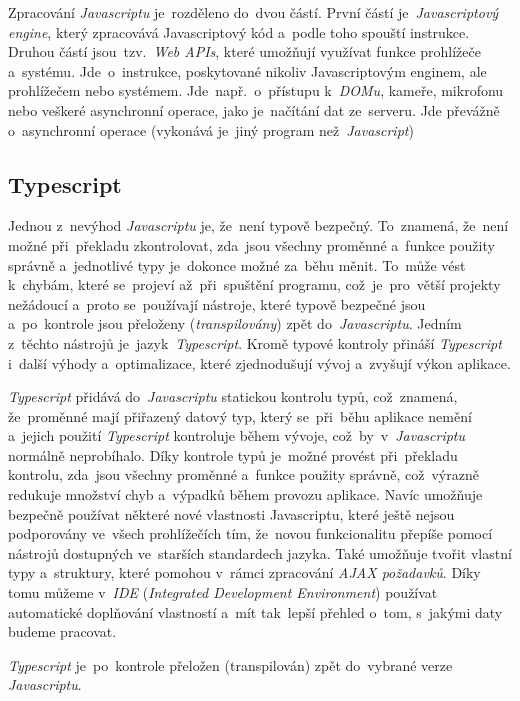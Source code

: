 \documentclass[10pt,a4paper]{article}
\begin{document}
            Zpracování \emph{Javascriptu} je~rozděleno do~dvou částí. První částí je~\emph{Javascriptový engine}, který zpracovává Javascriptový kód a~podle toho spouští instrukce. Druhou částí jsou~tzv.~\emph{Web APIs}, které umožňují využívat funkce prohlížeče a~systému. Jde~o~instrukce, poskytované nikoliv Javascriptovým enginem, ale prohlížečem nebo systémem. Jde~např.~o~přístupu k~\emph{DOMu}, kameře, mikrofonu nebo veškeré asynchronní operace, jako je~načítání dat ze~serveru. Jde převážně o~asynchronní operace (vykonává je~jiný program než~\emph{Javascript}) \cite{kantor_javascript}

        \subsection{Typescript}
            Jednou z~nevýhod \emph{Javascriptu} je, že~není typově bezpečný. To~znamená, že~není možné při~překladu zkontrolovat, zda~jsou všechny proměnné a~funkce použity správně a~jednotlivé typy je~dokonce možné za~běhu měnit. To~může vést k~chybám, které se~projeví až~při~spuštění programu, což~je~pro~větší projekty nežádoucí a~proto se~používají nástroje, které typově bezpečné jsou a~po~kontrole jsou přeloženy (\emph{transpilovány}) zpět do~\emph{Javascriptu}. Jedním z~těchto nástrojů je~jazyk~\emph{Typescript}. Kromě typové kontroly přináší \emph{Typescript} i~další výhody a~optimalizace, které zjednodušují vývoj a~zvyšují výkon aplikace.

            \emph{Typescript} přidává do~\emph{Javascriptu} statickou kontrolu typů, což~znamená, že~proměnné mají přiřazený datový typ, který se~při~běhu aplikace nemění a~jejich použití \emph{Typescript} kontroluje během vývoje, což~by~v~\emph{Javascriptu} normálně neprobíhalo. Díky kontrole typů je~možné provést při~překladu kontrolu, zda~jsou všechny proměnné a~funkce použity správně, což~výrazně redukuje množství chyb a~výpadků během provozu aplikace. Navíc umožňuje bezpečně používat některé nové vlastnosti Javascriptu, které ještě nejsou podporovány ve~všech prohlížečích tím, že~novou funkcionalitu přepíše pomocí nástrojů dostupných ve~starších standardech jazyka. Také umožňuje tvořit vlastní typy a~struktury, které pomohou v~rámci zpracování \emph{AJAX požadavků}. Díky tomu můžeme v~\emph{IDE} (\emph{Integrated Development Environment}) používat automatické doplňování vlastností a~mít tak~lepší přehled o~tom, s~jakými daty budeme pracovat.

            \emph{Typescript} je~po~kontrole přeložen (transpilován) zpět do~vybrané verze \emph{Javascriptu}. \cite[Get started/TypeScript for the New Programmer]{TypeScript}
\end{document}
